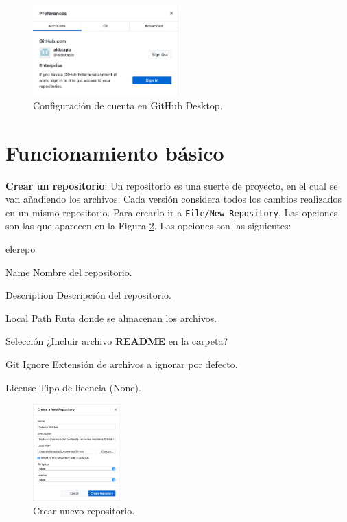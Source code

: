 \documentclass[10pt]{article}
\begin{document}
\begin{figure}[!h]
  \centering
    \includegraphics[width=0.5\textwidth]{Figuras/cuenta.png}
  \caption{Configuración de cuenta en GitHub Desktop.}
  \label{cuenta}
\end{figure}

\FloatBarrier

\section{Funcionamiento básico}

\textbf{Crear un repositorio}: Un repositorio es una suerte de proyecto, en el cual se van añadiendo los archivos. Cada versión considera todos los cambios realizados en un mismo repositorio. Para crearlo ir a \texttt{File/New Repository}. Las opciones son las que aparecen en la Figura \ref{repo}. Las opciones son las siguientes:\\

\begin{labeling}{elerepo}
\item [Name] Nombre del repositorio.
\item [Description] Descripción del repositorio.
\item [Local Path] Ruta donde se almacenan los archivos.
\item [Selección] ¿Incluir archivo \textbf{README} en la carpeta?
\item [Git Ignore] Extensión de archivos a ignorar por defecto.
\item [License] Tipo de licencia (None).
\end{labeling}

\begin{figure}[!h]
  \centering
    \includegraphics[width=0.3\textwidth]{Figuras/repo.png}
  \caption{Crear nuevo repositorio.}
  \label{repo}
\end{figure}
\end{document}
